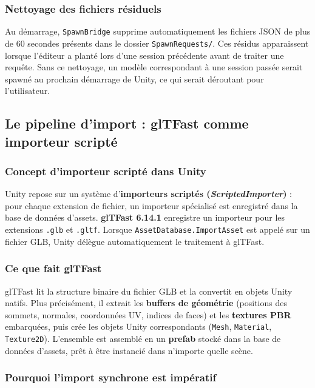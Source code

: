 \documentclass[12pt,a4paper,oneside]{report}
\begin{document}
\subsubsection{Nettoyage des fichiers résiduels}

Au démarrage, \texttt{SpawnBridge} supprime automatiquement les
fichiers JSON de plus de 60 secondes présents dans le dossier
\texttt{SpawnRequests/}. Ces résidus apparaissent lorsque l'éditeur
a planté lors d'une session précédente avant de traiter une requête.
Sans ce nettoyage, un modèle correspondant à une session passée
serait spawné au prochain démarrage de Unity, ce qui serait
déroutant pour l'utilisateur.

\subsection{Le pipeline d'import : glTFast comme importeur scripté}

\subsubsection{Concept d'importeur scripté dans Unity}

Unity repose sur un système d'\textbf{importeurs scriptés
(\textit{ScriptedImporter})} : pour chaque extension de fichier,
un importeur spécialisé est enregistré dans la base de données
d'assets. \textbf{glTFast 6.14.1} enregistre un importeur pour les
extensions \texttt{.glb} et \texttt{.gltf}. Lorsque
\texttt{AssetDatabase.ImportAsset} est appelé sur un fichier GLB,
Unity délègue automatiquement le traitement à glTFast.

\subsubsection{Ce que fait glTFast}

glTFast lit la structure binaire du fichier GLB et la convertit en
objets Unity natifs. Plus précisément, il extrait les
\textbf{buffers de géométrie} (positions des sommets, normales,
coordonnées UV, indices de faces) et les \textbf{textures PBR}
embarquées, puis crée les objets Unity correspondants
(\texttt{Mesh}, \texttt{Material}, \texttt{Texture2D}).
L'ensemble est assemblé en un \textbf{prefab} stocké dans la base
de données d'assets, prêt à être instancié dans n'importe quelle
scène.

\subsubsection{Pourquoi l'import synchrone est impératif}
\end{document}
